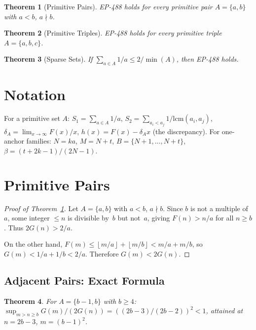 \documentclass[11pt,a4paper]{article}
\newtheorem{theorem}{Theorem}[section]
\theoremstyle{definition}
\newcommand{\floor}[1]{\left\lfloor #1 \right\rfloor}
\begin{document}
\begin{theorem}[Primitive Pairs]\label{thm:pairs}
EP-488 holds for every primitive pair $A = \{a, b\}$ with $a < b$, $a \nmid b$.
\end{theorem}

\begin{theorem}[Primitive Triples]\label{thm:triples}
EP-488 holds for every primitive triple $A = \{a, b, c\}$.
\end{theorem}

\begin{theorem}[Sparse Sets]\label{thm:sparse}
If $\sum_{a \in A} 1/a \leq 2/\min(A)$, then EP-488 holds.
\end{theorem}

\section{Notation}

For a primitive set $A$: $S_1 = \sum_{a \in A} 1/a$,
$S_2 = \sum_{a_i < a_j} 1/\mathrm{lcm}(a_i, a_j)$,
$\delta_A = \lim_{x \to \infty} F(x)/x$,
$h(x) = F(x) - \delta_A x$ (the discrepancy).
For one-anchor families: $N = ka$, $M = N{+}t$, $B = \{N{+}1,\ldots,N{+}t\}$,
$\beta = (t{+}2k{-}1)/(2N{-}1)$.

\section{Primitive Pairs}

\begin{proof}[Proof of Theorem~\ref{thm:pairs}]
Let $A = \{a, b\}$ with $a < b$, $a \nmid b$. Since $b$ is not a multiple
of~$a$, some integer $\leq n$ is divisible by~$b$ but not~$a$, giving
$F(n) > n/a$ for all $n \geq b$. Thus $2G(n) > 2/a$.

On the other hand, $F(m) \leq \floor{m/a} + \floor{m/b} < m/a + m/b$,
so $G(m) < 1/a + 1/b < 2/a$. Therefore $G(m) < 2G(n)$.
\end{proof}

\subsection{Adjacent Pairs: Exact Formula}

\begin{theorem}\label{thm:adjacent}
For $A = \{b{-}1, b\}$ with $b \geq 4$:
$\sup_{m > n \geq b} G(m)/(2G(n))
= ((2b{-}3)/(2b{-}2))^2 < 1$,
attained at $n = 2b{-}3$, $m = (b{-}1)^2$.
\end{theorem}
\end{document}
